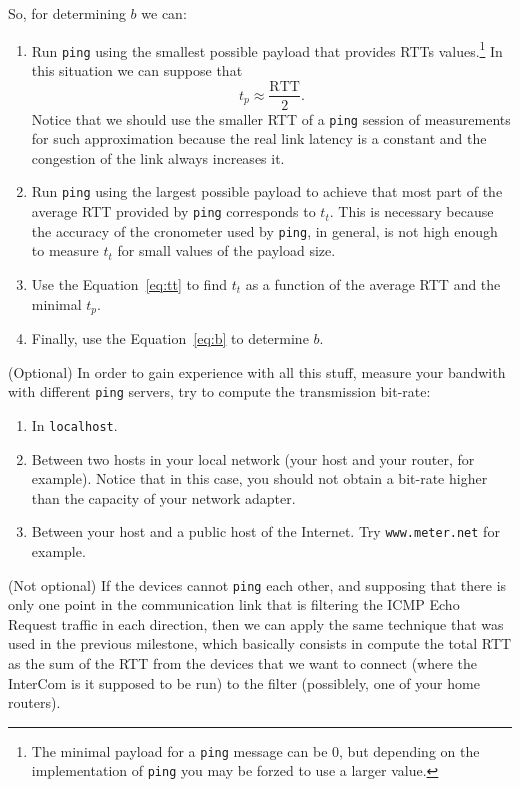 So, for determining $b$ we can:
\begin{enumerate}
\item Run \texttt{ping} using the smallest possible payload that
  provides RTTs values.\footnote{The minimal payload for a
  \texttt{ping} message can be 0, but depending on the implementation
  of \texttt{ping} you may be forzed to use a larger value.} In this
  situation we can suppose that
  \begin{equation}
    t_p \approx \frac{\text{RTT}}{2}.
    \label{eq:tp}
  \end{equation}
  Notice that we should use the smaller RTT of a \texttt{ping} session
  of measurements for such approximation because the real link latency
  is a constant and the congestion of the link always increases
  it.
\item Run \texttt{ping} using the largest possible payload to achieve
  that most part of the average RTT provided by \texttt{ping}
  corresponds to $t_t$. This is necessary because the accuracy of the
  cronometer used by \texttt{ping}, in general, is not high enough to
  measure $t_t$ for small values of the payload size.
\item Use the Equation~\ref{eq:tt} to find $t_t$ as a function of
  the average RTT and the minimal $t_p$.
\item Finally, use the Equation~\ref{eq:b} to determine $b$.
\end{enumerate}

(Optional) In order to gain experience with all this stuff, measure
your bandwith with different \texttt{ping} servers, try to compute the
transmission bit-rate:
\begin{enumerate}
\item In \texttt{localhost}.
\item Between two hosts in your local network (your host and your
  router, for example). Notice that in this case, you should not
  obtain a bit-rate higher than the capacity of your network adapter.
\item Between your host and a public host of the Internet. Try
  \texttt{www.meter.net} for example.
\end{enumerate}

(Not optional) If the devices cannot \texttt{ping} each other, and
supposing that there is only one point in the communication link that
is filtering the ICMP Echo Request traffic in each direction, then we
can apply the same technique that was used in the previous milestone,
which basically consists in compute the total RTT as the sum of the
RTT from the devices that we want to connect (where the InterCom is it
supposed to be run) to the filter (possiblely, one of your home
routers).

